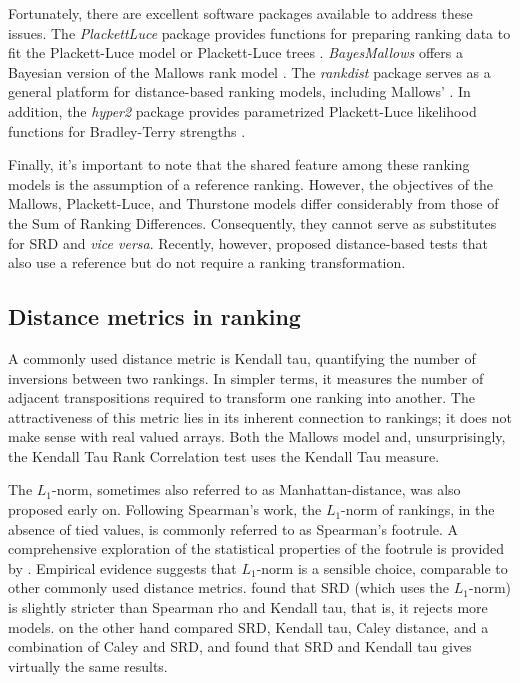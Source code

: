 Fortunately, there are excellent software packages available to address these issues.  The \emph{PlackettLuce} package provides functions for preparing ranking data to fit the Plackett-Luce model or Plackett-Luce trees \citep{PlackettLuce_vgn}. \emph{BayesMallows} offers a Bayesian version of the Mallows rank model \citep{BayesMallows_vgn}. The \emph{rankdist} package serves as a general platform for distance-based ranking models, including Mallows' \citep{Qian2019}. In addition, the \emph{hyper2} package provides parametrized Plackett-Luce likelihood functions for Bradley-Terry strengths \citep{Hankin2017,Hankin2024}.

Finally, it's important to note that the shared feature among these ranking models is the assumption of a reference ranking. However, the objectives of the Mallows, Plackett-Luce, and Thurstone models differ considerably from those of the Sum of Ranking Differences. Consequently, they cannot serve as substitutes for SRD and \emph{vice versa}. Recently, however, \citet{HEBERGER2026} proposed distance-based tests that also use a reference but do not require a ranking transformation.

\subsection{Distance metrics in ranking}\label{sec:lit_distance}

A commonly used distance metric is Kendall tau, quantifying the number of inversions between two rankings. In simpler terms, it measures the number of adjacent transpositions required to transform one ranking into another. The attractiveness of this metric lies in its inherent connection to rankings; it does not make sense with real valued arrays. Both the Mallows model and, unsurprisingly, the Kendall Tau Rank Correlation test uses the Kendall Tau measure.

The $L_1$-norm, sometimes also referred to as Manhattan-distance, was also proposed early on. Following Spearman's work, the $L_1$-norm of rankings, in the absence of tied values, is commonly referred to as Spearman's footrule. A comprehensive exploration of the statistical properties of the footrule is provided by \cite{Diaconis_Graham_1977}. Empirical evidence suggests that $L_1$-norm is a sensible choice, comparable to other commonly used distance metrics. \citet{HEBERGER2012} found that SRD (which uses the $L_1$-norm) is slightly stricter than Spearman rho and Kendall tau, that is, it rejects more models. \citet{Sipos2018} on the other hand compared SRD, Kendall tau, Caley distance, and a combination of Caley and SRD, and found that SRD and Kendall tau gives virtually the same results.

